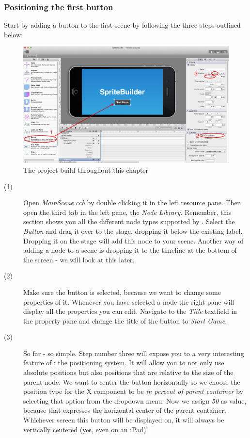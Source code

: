 \subsubsection{Positioning the first button}
\begin{leftbar}
Start by adding a button to the first scene by following the three steps
outlined below:

\begin{figure}[H]
		\centering
		\includegraphics[width=0.9\linewidth]{images/firstproject/add_button.png}
		\caption{The project build throughout this chapter}
\end{figure}

\begin{description}
\item[(1)] Open \textit{MainScene.ccb} by double clicking it in the left
resource pane. Then open the third tab in the left pane, the \textit{Node
Library}. Remember, this section shows you all the different node types
supported by \SB{}. Select the \textit{Button} and drag it over to the stage,
dropping it below the existing label. Dropping it on the stage will add this
node to your scene. Another way of adding a node to a scene is dropping it to
the timeline at the bottom of the screen - we will look at this later.
\item[(2)] Make sure the button is selected, because we want to change some
properties of it. Whenever you have selected a node the right pane will display
all the properties you can edit. Navigate to the \textit{Title} textfield in the
property pane and change the title of the button to \textit{Start Game}.
\item[(3)] So far - so simple. Step number three will expose you to a very
interesting feature of \SB{}: the positioning system. It will allow you to not
only use absolute positions but also positions that are relative to the size of
the parent node. We want to center the button horizontally so we choose the
position type for the X component to be \textit{in percent of parent
container} by selecting that option from the dropdown menu. Now we assign
\textit{50} as value, because that expresses the horizontal center of the parent
container. Whichever screen this button will be displayed on, it will always be
vertically centered (yes, even on an iPad)!
\end{description}
\end{leftbar}

